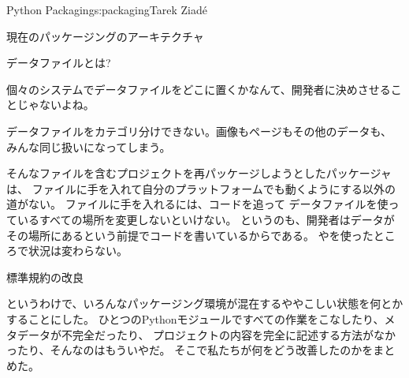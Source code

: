 \begin{aosachapter}{Python Packaging}{s:packaging}{Tarek Ziad\'{e}}
\begin{aosasect1}{現在のパッケージングのアーキテクチャ}
\begin{aosasect2}{データファイルとは?}
\begin{aosaitemize}
  \item 個々のシステムでデータファイルをどこに置くかなんて、開発者に決めさせることじゃないよね。

  \item データファイルをカテゴリ分けできない。画像もページもその他のデータも、
  みんな同じ扱いになってしまう。

\end{aosaitemize}

そんなファイルを含むプロジェクトを再パッケージしようとしたパッケージャは、
ファイルに手を入れて自分のプラットフォームでも動くようにする以外の道がない。
ファイルに手を入れるには、コードを追って
データファイルを使っているすべての場所を変更しないといけない。
というのも、開発者はデータがその場所にあるという前提でコードを書いているからである。
やを使ったところで状況は変わらない。

\end{aosasect2}

\end{aosasect1}

\begin{aosasect1}{標準規約の改良}

というわけで、いろんなパッケージング環境が混在するややこしい状態を何とかすることにした。
ひとつのPythonモジュールですべての作業をこなしたり、メタデータが不完全だったり、
プロジェクトの内容を完全に記述する方法がなかったり、そんなのはもういやだ。
そこで私たちが何をどう改善したのかをまとめた。


\end{aosasect1}
\end{aosachapter}
